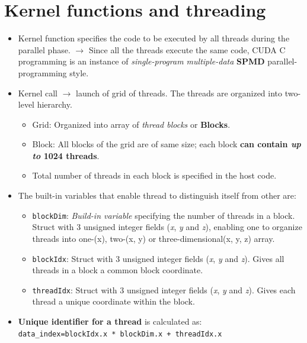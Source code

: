 \section{Kernel functions and threading}
\begin{itemize}
    \item Kernel function specifies the code to be executed by all threads during the parallel phase. $\rightarrow$ Since all the threads execute the same code, CUDA C programming is an instance of \textit{single-program multiple-data} \textbf{SPMD} parallel-programming style.
    \item Kernel call $\rightarrow$ launch of grid of threads. The threads are organized into two-level hierarchy.
          \begin{itemize}
              \item Grid: Organized into array of \textit{thread blocks} or \textbf{Blocks}.
              \item Block: All blocks of the grid are of same size; each block \textbf{can contain \textit{up to} 1024 threads}.
              \item Total number of threads in each block is specified in the host code.
          \end{itemize}
    \item The built-in variables that enable thread to distinguish itself from other are:
          \begin{itemize}
              \item \texttt{blockDim}: \textit{Build-in variable} specifying the number of threads in a block. Struct with 3 unsigned integer fields (\textit{x}, \textit{y} and \textit{z}), enabling one to organize threads into one-(x), two-(x, y) or three-dimensional(x, y, z) array.
              \item \texttt{blockIdx}:  Struct with 3 unsigned integer fields (\textit{x}, \textit{y} and \textit{z}). Gives all threads in a block a common block coordinate.
              \item \texttt{threadIdx}: Struct with 3 unsigned integer fields (\textit{x}, \textit{y} and \textit{z}). Gives each thread a unique coordinate within the block.
          \end{itemize}
    \item \textbf{Unique identifier for a thread} is calculated as:\\\texttt{data\_index=blockIdx.x * blockDim.x + threadIdx.x}
          \begin{figure}[H]
              \centering

\end{figure}
\end{itemize}
